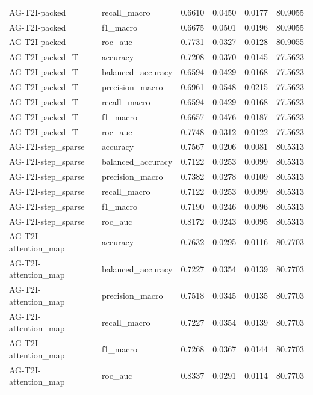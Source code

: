 \begin{tabular}{llrrrr}
AG-T2I-packed & recall_macro & 0.6610 & 0.0450 & 0.0177 & 80.9055 \\
AG-T2I-packed & f1_macro & 0.6675 & 0.0501 & 0.0196 & 80.9055 \\
AG-T2I-packed & roc_auc & 0.7731 & 0.0327 & 0.0128 & 80.9055 \\
AG-T2I-packed_T & accuracy & 0.7208 & 0.0370 & 0.0145 & 77.5623 \\
AG-T2I-packed_T & balanced_accuracy & 0.6594 & 0.0429 & 0.0168 & 77.5623 \\
AG-T2I-packed_T & precision_macro & 0.6961 & 0.0548 & 0.0215 & 77.5623 \\
AG-T2I-packed_T & recall_macro & 0.6594 & 0.0429 & 0.0168 & 77.5623 \\
AG-T2I-packed_T & f1_macro & 0.6657 & 0.0476 & 0.0187 & 77.5623 \\
AG-T2I-packed_T & roc_auc & 0.7748 & 0.0312 & 0.0122 & 77.5623 \\
AG-T2I-step_sparse & accuracy & 0.7567 & 0.0206 & 0.0081 & 80.5313 \\
AG-T2I-step_sparse & balanced_accuracy & 0.7122 & 0.0253 & 0.0099 & 80.5313 \\
AG-T2I-step_sparse & precision_macro & 0.7382 & 0.0278 & 0.0109 & 80.5313 \\
AG-T2I-step_sparse & recall_macro & 0.7122 & 0.0253 & 0.0099 & 80.5313 \\
AG-T2I-step_sparse & f1_macro & 0.7190 & 0.0246 & 0.0096 & 80.5313 \\
AG-T2I-step_sparse & roc_auc & 0.8172 & 0.0243 & 0.0095 & 80.5313 \\
AG-T2I-attention_map & accuracy & 0.7632 & 0.0295 & 0.0116 & 80.7703 \\
AG-T2I-attention_map & balanced_accuracy & 0.7227 & 0.0354 & 0.0139 & 80.7703 \\
AG-T2I-attention_map & precision_macro & 0.7518 & 0.0345 & 0.0135 & 80.7703 \\
AG-T2I-attention_map & recall_macro & 0.7227 & 0.0354 & 0.0139 & 80.7703 \\
AG-T2I-attention_map & f1_macro & 0.7268 & 0.0367 & 0.0144 & 80.7703 \\
AG-T2I-attention_map & roc_auc & 0.8337 & 0.0291 & 0.0114 & 80.7703 \\
\bottomrule
\end{tabular}
